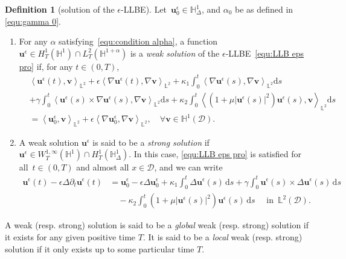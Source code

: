 \documentclass[11pt,reqno]{amsart}
\theoremstyle{definition}
\newtheorem{definition}[theorem]{Definition}
\numberwithin{equation}{section}
\newcommand{\bff}{\boldsymbol}
\newcommand{\bb}{\mathbb}
\newcommand{\ds}{\mathrm{d}s}
\newcommand{\nn}{\nonumber}
\newcommand{\inpro}[2]{\left\langle#1,#2\right\rangle}
\begin{document}
\begin{definition}[solution of the $\epsilon$-LLBE]\label{def:wea sol}
	\normalfont
	Let~$\bff{u}_0^\epsilon\in\bb{H}^1_\Delta$, and $\alpha_0$ be as defined in \eqref{equ:gamma 0}.
	\begin{enumerate}
		\item 
		  For any $\alpha$ satisfying~\eqref{equ:condition alpha}, a function~$\bff{u}^\epsilon\in H^1_T(\bb{H}^1)\cap L^2_T(\bb{H}^{1+\alpha})$
		is a \emph{weak solution} of the $\epsilon$-LLBE~\eqref{equ:LLB eps pro} if, for any $t\in (0,T)$,
		\begin{align}\label{equ:weak sol}
			&\inpro{\bff{u}^\epsilon (t)}{\bff{v}}_{\bb{L}^2}
			+
			\epsilon 
			\inpro{\nabla \bff{u}^\epsilon(t)}{\nabla \bff{v}}_{\bb{L}^2}
			+
			\kappa_1 
			\int_0^t
			\inpro{\nabla\bff{u}^\epsilon(s)}{\nabla\bff{v}}_{\bb{L}^2} \ds
			\nn \\
			&+
			\gamma
			\int_0^t
			\inpro{\bff{u}^\epsilon(s)\times\nabla\bff{u}^\epsilon(s)}{\nabla\bff{v}}_{\bb{L}^2} \ds
			+
			\kappa_2
			\int_0^t
			\inpro{(1+\mu|\bff{u}^\epsilon(s)|^2)\bff{u}^\epsilon(s)}{\bff{v}}_{\bb{L}^2} \ds
			\nn\\
			&= 
            \inpro{\bff{u}^\epsilon_0}{\bff{v}}_{\bb{L}^2}
			+
			\epsilon 
			\inpro{\nabla \bff{u}^\epsilon_0}{\nabla \bff{v}}_{\bb{L}^2},
			\quad \forall \bff{v}\in \bb{H}^1(\mathscr{D}).
		\end{align}
		\item A weak solution $\bff{u}^\epsilon$ is said to be a \emph{strong solution}
		if $\bff{u}^\epsilon\in W^{1,\infty}_T(\bb{H}^1) \cap H^1_T(\bb{H}^1_\Delta)$. In this case, \eqref{equ:LLB eps pro} is satisfied
		for all~$t\in(0,T)$ and almost all $x\in \mathscr{D}$, and we can write
		\begin{align}\label{equ:u eps L2}
			\bff{u}^\epsilon(t)
            -
            \epsilon \Delta \partial_t\bff{u}^\epsilon(t) 
			&= 
			\bff{u}^\epsilon_0
			-
            \epsilon \Delta \bff{u}^\epsilon_0
			+
			\kappa_1\int_0^t\Delta\bff{u}^\epsilon(s)\, \ds
			+
			\gamma\int_0^t\bff{u}^\epsilon(s)\times  \Delta\bff{u}^\epsilon(s) \,\ds
			\nn\\
			&\quad-
			\kappa_2\int_0^t(1+\mu|\bff{u}^\epsilon(s)|^2)\bff{u}^\epsilon(s) \,\ds
			\quad\text{ in }\,\bb{L}^2(\mathscr{D}).
		\end{align}
	\end{enumerate}
	A weak (resp. strong) solution is said to be a \emph{global} weak (resp. strong) solution if it exists for any given positive time $T$. It is said to be a \emph{local} weak (resp. strong) solution if it only exists up to some particular time $T$.
\end{definition}
\end{document}
